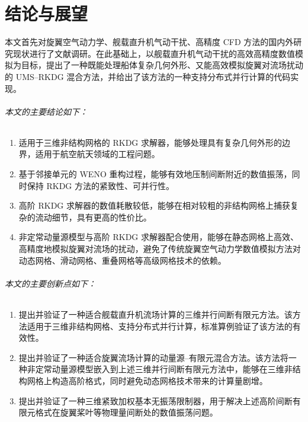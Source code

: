 \chapter*{结论与展望}


本文首先对旋翼空气动力学、舰载直升机气动干扰、高精度 CFD 方法的国内外研究现状进行了文献调研。在此基础上，以舰载直升机气动干扰的高效高精度数值模拟为目标，提出了一种既能处理船体复杂几何外形、又能高效模拟旋翼对流场扰动的
UMS–RKDG 混合方法，并给出了该方法的一种支持分布式并行计算的代码实现。

\subparagraph*{本文的主要结论如下：}
\begin{enumerate}[wide]
\item 适用于三维非结构网格的 RKDG 求解器，能够处理具有复杂几何外形的边界，适用于航空航天领域的工程问题。
\item 基于邻接单元的 WENO 重构过程，能够有效地压制间断附近的数值振荡，同时保持 RKDG 方法的紧致性、可并行性。
\item 高阶 RKDG 求解器的数值耗散较低，能够在相对较粗的非结构网格上捕获复杂的流动细节，具有更高的性价比。 
\item 非定常动量源模型与高阶 RKDG 求解器配合使用，能够在静态网格上高效、高精度地模拟旋翼对流场的扰动，避免了传统旋翼空气动力学数值模拟方法对动态网格、滑动网格、重叠网格等高级网格技术的依赖。
\end{enumerate}
%

\subparagraph*{本文的主要创新点如下：}
\begin{enumerate}[wide]
\item 提出并验证了一种适合舰载直升机流场计算的三维并行间断有限元方法。该方法适用于三维非结构网格、支持分布式并行计算，标准算例验证了该方法的有效性。
\item 提出并验证了一种适合旋翼流场计算的动量源–有限元混合方法。该方法将一种非定常动量源模型嵌入到上述三维并行间断有限元方法中，能够在三维非结构网格上构造高阶格式，同时避免动态网格技术带来的计算量剧增。
\item 提出并验证了一种三维紧致加权基本无振荡限制器，用于解决上述高阶间断有限元格式在旋翼桨叶等物理量间断处的数值振荡问题。
\end{enumerate}
%

